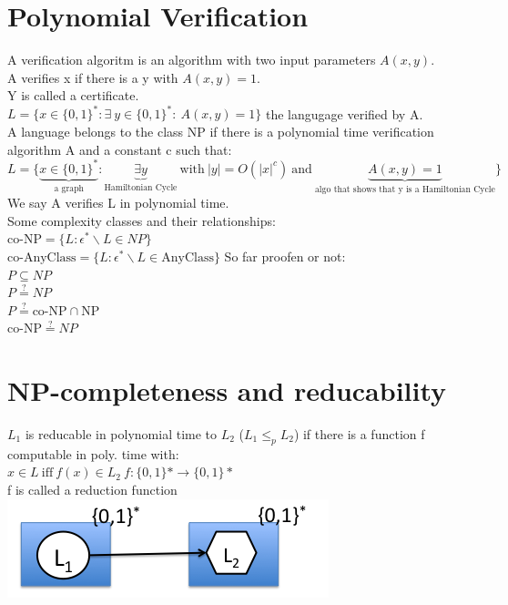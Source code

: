 \section{Polynomial Verification}
A verification algoritm is an algorithm with two input parameters $A(x,y)$. \\
A verifies x if there is a y with $A(x,y) = 1$.\\
Y is called a certificate.\\
$L=\{ x \in \{ 0,1 \}^*: \exists ~ y \in \{ 0,1 \}^*:~A(x,y)=1\}$ the langugage verified by A.\\

A language belongs to the class NP if there is a polynomial time verification algorithm A and a constant c such that: \\
$L=\{ \underbrace{x \in \{ 0,1 \}^*}_{\text{a graph}}: \underbrace{\exists y}_{\text{Hamiltonian Cycle}} ~\text{with}~ \left|y \right|=O(\left| x \right|^c) ~\text{and}~ \underbrace{A(x,y)=1}_{\text{algo that shows that y is a Hamiltonian Cycle}}\}$  \\
We say A verifies L in polynomial time.\\
\vspace{0.3cm}
Some complexity classes and their relationships:\\
$\text{co-NP} = \{ L: \epsilon^* \backslash L \in NP  \}$\\
$\text{co-AnyClass} = \{ L: \epsilon^* \backslash L \in \text{AnyClass} \}$
So far proofen or not:\\
$P \subseteq NP$ \\
$P \stackrel{?}{=} NP$ \\
$P \stackrel{?}{=} \text{co-NP} \cap \text{NP}$ \\
$\text{co-NP} \stackrel{?}{=} NP$ \\

\section{NP-completeness and reducability}
$L_{1}$ is reducable in polynomial time to $L_{2}$ ($L_{1} \leq_{p} L_{2}$) if there is a function f computable in poly. time
with: \\
$x \in L ~\text{iff}~ f(x) \in L_{2} ~f:\{ 0,1 \}* \rightarrow \{ 0,1 \}*$\\
f is called a reduction function\\
\includegraphics[scale=0.5]{diagrams/reductions}

